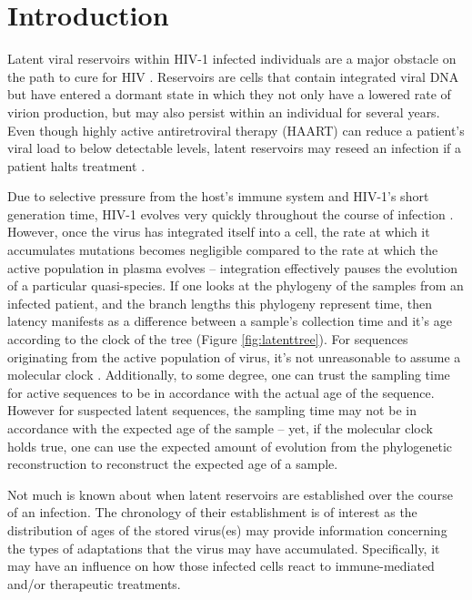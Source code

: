 \section{Introduction} \label{sec:intro}
Latent viral reservoirs within HIV-1 infected individuals are a major obstacle on the path to cure for HIV \citep{Pace11}. 
Reservoirs are cells that contain integrated viral DNA but have entered a dormant state in which they not only have a lowered rate of virion production, but may also persist within an individual for several years.
Even though highly active antiretroviral therapy (HAART) can reduce a patient's viral load to below detectable levels, latent reservoirs may reseed an infection if a patient halts treatment \citep{Joos08, Pomerantz03, Richman09}.


Due to selective pressure from the host's immune system and HIV-1's short generation time, HIV-1 evolves very quickly throughout the course of infection \citep{Alizon13, Shankarappa99, Rambaut04}. 
However, once the virus has integrated itself into a cell, the rate at which it accumulates mutations becomes negligible compared to the rate at which the active population in plasma evolves -- integration effectively pauses the evolution of a particular quasi-species. 
If one looks at the phylogeny of the samples from an infected patient, and the branch lengths this phylogeny represent time, then latency manifests as a difference between a sample's collection time and it's age according to the clock of the tree (Figure \ref{fig:latenttree}). 
For sequences originating from the active population of virus, it's not unreasonable to assume a molecular clock \citep{Leitner99, Kuhner95, Korber00}. 
Additionally, to some degree, one can trust the sampling time for active sequences to be in accordance with the actual age of the sequence.
However for suspected latent sequences, the sampling time may not be in accordance with the expected age of the sample -- yet, if the molecular clock holds true, one can use the expected amount of evolution from the phylogenetic reconstruction to reconstruct the expected age of a sample.

Not much is known about when latent reservoirs are established over the course of an infection. 
The chronology of their establishment is of interest as the distribution of ages of the stored virus(es) may provide information concerning the types of adaptations that the virus may have accumulated. 
Specifically, it may have an influence on how those infected cells react to immune-mediated and/or therapeutic treatments. 

